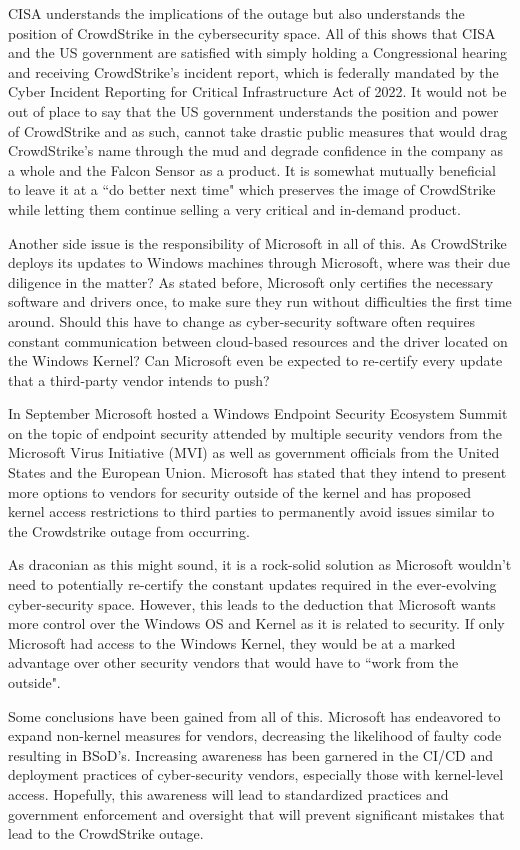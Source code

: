 CISA understands the implications of the outage but also understands the position of CrowdStrike in the cybersecurity space. All of this shows that CISA and the US government are satisfied with simply holding a Congressional hearing and receiving CrowdStrike's incident report, which is federally mandated by the Cyber Incident Reporting for Critical Infrastructure Act of 2022. It would not be out of place to say that the US government understands the position and power of CrowdStrike and as such, cannot take drastic public measures that would drag CrowdStrike's name through the mud and degrade confidence in the company as a whole and the Falcon Sensor as a product. It is somewhat mutually beneficial to leave it at a ``do better next time" which preserves the image of CrowdStrike while letting them continue selling a very critical and in-demand product.

Another side issue is the responsibility of Microsoft in all of this. As CrowdStrike deploys its updates to Windows machines through Microsoft, where was their due diligence in the matter? As stated before, Microsoft only certifies the necessary software and drivers once, to make sure they run without difficulties the first time around. Should this have to change as cyber-security software often requires constant communication between cloud-based resources and the driver located on the Windows Kernel? Can Microsoft even be expected to re-certify every update that a third-party vendor intends to push?

In September Microsoft hosted a Windows Endpoint Security Ecosystem Summit on the topic of endpoint security attended by multiple security vendors from the Microsoft Virus Initiative (MVI) as well as government officials from the United States and the European Union. Microsoft has stated that they intend to present more options to vendors for security outside of the kernel and has proposed kernel access restrictions to third parties to permanently avoid issues similar to the Crowdstrike outage from occurring.

As draconian as this might sound, it is a rock-solid solution as Microsoft wouldn't need to potentially re-certify the constant updates required in the ever-evolving cyber-security space. However, this leads to the deduction that Microsoft wants more control over the Windows OS and Kernel as it is related to security. If only Microsoft had access to the Windows Kernel, they would be at a marked advantage over other security vendors that would have to ``work from the outside".

Some conclusions have been gained from all of this. Microsoft has endeavored to expand non-kernel measures for vendors, decreasing the likelihood of faulty code resulting in BSoD's. Increasing awareness has been garnered in the CI/CD and deployment practices of cyber-security vendors, especially those with kernel-level access. Hopefully, this awareness will lead to standardized practices and government enforcement and oversight that will prevent significant mistakes that lead to the CrowdStrike outage. \hfill \cite{utility_dive_crowdstrike, homeland_committee_crowdstrike, sc_media_crowdstrike_outage}